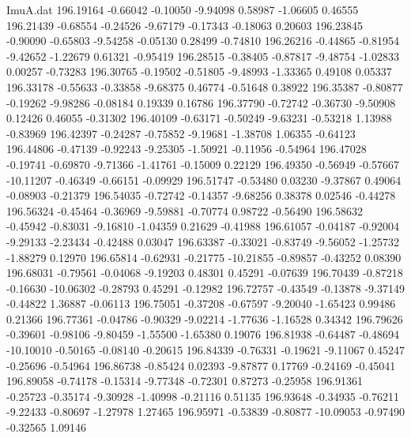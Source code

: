 \begin{filecontents}{ImuA.dat}
 196.19164   -0.66042   -0.10050   -9.94098    0.58987   -1.06605    0.46555
 196.21439   -0.68554   -0.24526   -9.67179   -0.17343   -0.18063    0.20603
 196.23845   -0.90090   -0.65803   -9.54258   -0.05130    0.28499   -0.74810
 196.26216   -0.44865   -0.81954   -9.42652   -1.22679    0.61321   -0.95419
 196.28515   -0.38405   -0.87817   -9.48754   -1.02833    0.00257   -0.73283
 196.30765   -0.19502   -0.51805   -9.48993   -1.33365    0.49108    0.05337
 196.33178   -0.55633   -0.33858   -9.68375    0.46774   -0.51648    0.38922
 196.35387   -0.80877   -0.19262   -9.98286   -0.08184    0.19339    0.16786
 196.37790   -0.72742   -0.36730   -9.50908    0.12426    0.46055   -0.31302
 196.40109   -0.63171   -0.50249   -9.63231   -0.53218    1.13988   -0.83969
 196.42397   -0.24287   -0.75852   -9.19681   -1.38708    1.06355   -0.64123
 196.44806   -0.47139   -0.92243   -9.25305   -1.50921   -0.11956   -0.54964
 196.47028   -0.19741   -0.69870   -9.71366   -1.41761   -0.15009    0.22129
 196.49350   -0.56949   -0.57667  -10.11207   -0.46349   -0.66151   -0.09929
 196.51747   -0.53480    0.03230   -9.37867    0.49064   -0.08903   -0.21379
 196.54035   -0.72742   -0.14357   -9.68256    0.38378    0.02546   -0.44278
 196.56324   -0.45464   -0.36969   -9.59881   -0.70774    0.98722   -0.56490
 196.58632   -0.45942   -0.83031   -9.16810   -1.04359    0.21629   -0.41988
 196.61057   -0.04187   -0.92004   -9.29133   -2.23434   -0.42488    0.03047
 196.63387   -0.33021   -0.83749   -9.56052   -1.25732   -1.88279    0.12970
 196.65814   -0.62931   -0.21775  -10.21855   -0.89857   -0.43252    0.08390
 196.68031   -0.79561   -0.04068   -9.19203    0.48301    0.45291   -0.07639
 196.70439   -0.87218   -0.16630  -10.06302   -0.28793    0.45291   -0.12982
 196.72757   -0.43549   -0.13878   -9.37149   -0.44822    1.36887   -0.06113
 196.75051   -0.37208   -0.67597   -9.20040   -1.65423    0.99486    0.21366
 196.77361   -0.04786   -0.90329   -9.02214   -1.77636   -1.16528    0.34342
 196.79626   -0.39601   -0.98106   -9.80459   -1.55500   -1.65380    0.19076
 196.81938   -0.64487   -0.48694  -10.10010   -0.50165   -0.08140   -0.20615
 196.84339   -0.76331   -0.19621   -9.11067    0.45247   -0.25696   -0.54964
 196.86738   -0.85424    0.02393   -9.87877    0.17769   -0.24169   -0.45041
 196.89058   -0.74178   -0.15314   -9.77348   -0.72301    0.87273   -0.25958
 196.91361   -0.25723   -0.35174   -9.30928   -1.40998   -0.21116    0.51135
 196.93648   -0.34935   -0.76211   -9.22433   -0.80697   -1.27978    1.27465
 196.95971   -0.53839   -0.80877  -10.09053   -0.97490   -0.32565    1.09146

\end{filecontents}
